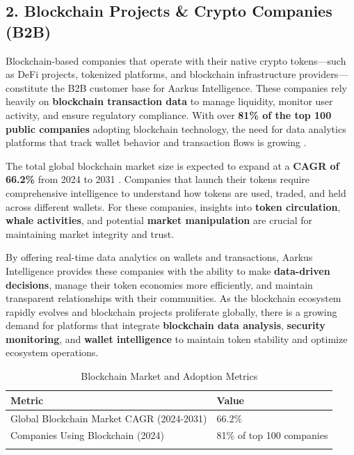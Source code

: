 \documentclass{article}
\begin{document}
\subsection{2. Blockchain Projects \& Crypto Companies (B2B)}

Blockchain-based companies that operate with their native crypto tokens—such as DeFi projects, tokenized platforms, and blockchain infrastructure providers—constitute the B2B customer base for Aarkus Intelligence. These companies rely heavily on \textbf{blockchain transaction data} to manage liquidity, monitor user activity, and ensure regulatory compliance. With over \textbf{81\% of the top 100 public companies} adopting blockchain technology, the need for data analytics platforms that track wallet behavior and transaction flows is growing \cite{DemandSage}.

The total global blockchain market size is expected to expand at a \textbf{CAGR of 66.2\%} from 2024 to 2031 \cite{Cognitive}. Companies that launch their tokens require comprehensive intelligence to understand how tokens are used, traded, and held across different wallets. For these companies, insights into \textbf{token circulation}, \textbf{whale activities}, and potential \textbf{market manipulation} are crucial for maintaining market integrity and trust.

By offering real-time data analytics on wallets and transactions, Aarkus Intelligence provides these companies with the ability to make \textbf{data-driven decisions}, manage their token economies more efficiently, and maintain transparent relationships with their communities. As the blockchain ecosystem rapidly evolves and blockchain projects proliferate globally, there is a growing demand for platforms that integrate \textbf{blockchain data analysis}, \textbf{security monitoring}, and \textbf{wallet intelligence} to maintain token stability and optimize ecosystem operations.


\begin{longtable}{|p{4cm}|p{8cm}|}
\hline
\textbf{Metric} & \textbf{Value} \\
\hline
Global Blockchain Market CAGR (2024-2031) & 66.2\% \\
\hline
Companies Using Blockchain (2024) & 81\% of top 100 companies \\
\hline
\caption{Blockchain Market and Adoption Metrics}
\end{longtable}
\end{document}
